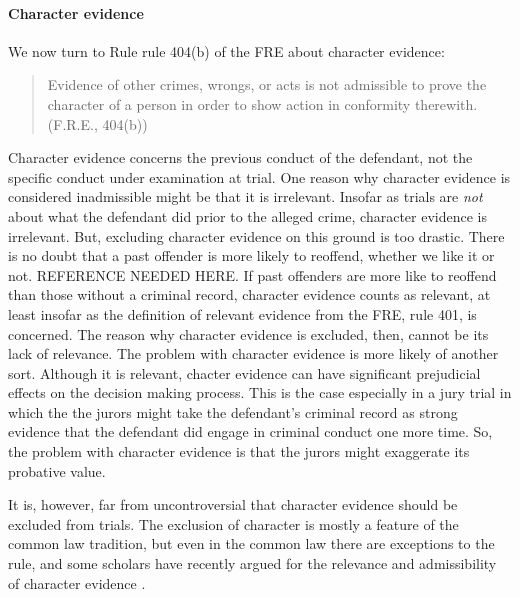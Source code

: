 \documentclass[10pt]{article}
\begin{document}
\paragraph{Character evidence}

We now turn to Rule rule 404(b) of the FRE about character evidence:
%
\begin{quote}
\begin{singlespace}
Evidence of other crimes, wrongs, or acts is not admissible to prove 
the character of a person in order to show action in conformity therewith.
(F.R.E., 404(b))
\end{singlespace}
\end{quote}
%
Character evidence concerns the previous conduct of the defendant, not the specific conduct 
under examination at trial. One reason why character evidence is considered inadmissible might be  
that it is irrelevant. Insofar as trials are \textit{not} about what the defendant did prior to the alleged crime, character evidence is irrelevant. But, excluding character 
evidence on this ground is too drastic. There is no doubt that a past offender is more likely to reoffend, whether we like it or not. REFERENCE NEEDED HERE. If past offenders are more like to reoffend than those without a criminal record, character evidence counts as relevant, at least insofar as the definition of relevant evidence from the FRE, rule 401, is concerned. The reason why character evidence is excluded, then, cannot be its lack of relevance. The problem with character evidence is more likely of another sort. Although it is relevant, chacter evidence can have significant 
prejudicial effects on the decision making process. This is the case especially in a jury trial in which the the jurors might take 
the defendant's criminal record as strong evidence that the defendant did engage in criminal conduct one more time. So, the problem with character 
evidence is that the jurors might exaggerate its probative value. 

It is, however, far from uncontroversial that character evidence should be excluded from trials. The exclusion of character 
is mostly a feature of the common law tradition, but even in the common law there are exceptions to the rule, %
and some scholars have recently argued for the relevance and admissibility 
of character evidence \citep{redmayne02}.
\end{document}
